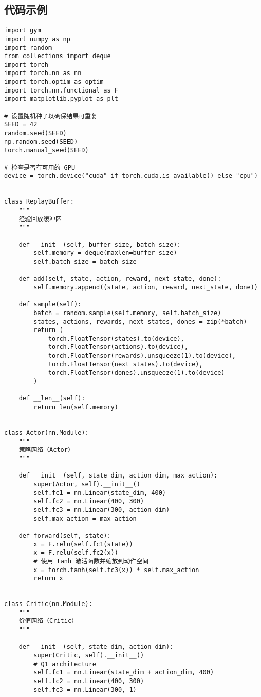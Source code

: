 \subsection*{代码示例}
\begin{lstlisting}
import gym
import numpy as np
import random
from collections import deque
import torch
import torch.nn as nn
import torch.optim as optim
import torch.nn.functional as F
import matplotlib.pyplot as plt

# 设置随机种子以确保结果可重复
SEED = 42
random.seed(SEED)
np.random.seed(SEED)
torch.manual_seed(SEED)

# 检查是否有可用的 GPU
device = torch.device("cuda" if torch.cuda.is_available() else "cpu")


class ReplayBuffer:
    """
    经验回放缓冲区
    """

    def __init__(self, buffer_size, batch_size):
        self.memory = deque(maxlen=buffer_size)
        self.batch_size = batch_size

    def add(self, state, action, reward, next_state, done):
        self.memory.append((state, action, reward, next_state, done))

    def sample(self):
        batch = random.sample(self.memory, self.batch_size)
        states, actions, rewards, next_states, dones = zip(*batch)
        return (
            torch.FloatTensor(states).to(device),
            torch.FloatTensor(actions).to(device),
            torch.FloatTensor(rewards).unsqueeze(1).to(device),
            torch.FloatTensor(next_states).to(device),
            torch.FloatTensor(dones).unsqueeze(1).to(device)
        )

    def __len__(self):
        return len(self.memory)


class Actor(nn.Module):
    """
    策略网络（Actor）
    """

    def __init__(self, state_dim, action_dim, max_action):
        super(Actor, self).__init__()
        self.fc1 = nn.Linear(state_dim, 400)
        self.fc2 = nn.Linear(400, 300)
        self.fc3 = nn.Linear(300, action_dim)
        self.max_action = max_action

    def forward(self, state):
        x = F.relu(self.fc1(state))
        x = F.relu(self.fc2(x))
        # 使用 tanh 激活函数并缩放到动作空间
        x = torch.tanh(self.fc3(x)) * self.max_action
        return x


class Critic(nn.Module):
    """
    价值网络（Critic）
    """

    def __init__(self, state_dim, action_dim):
        super(Critic, self).__init__()
        # Q1 architecture
        self.fc1 = nn.Linear(state_dim + action_dim, 400)
        self.fc2 = nn.Linear(400, 300)
        self.fc3 = nn.Linear(300, 1)


\end{lstlisting}
